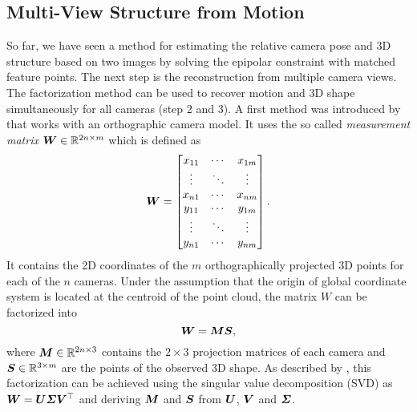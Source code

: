 			
		\subsection{Multi-View Structure from Motion}
			So far, we have seen a method for estimating the relative camera pose and 3D structure based on two images by solving the epipolar constraint with matched feature points.
			The next step is the reconstruction from multiple camera views.
			The factorization method can be used to recover motion and 3D shape simultaneously for all cameras (step 2 and 3).
			A first method was introduced by \cite{tomasi1992factorization} that works with an orthographic camera model.
			It uses the so called \emph{measurement matrix} $\bm{W} \in \mathbb{R}^{2n \times m}$ which is defined as
			\begin{equation}\label{eq:measurement_matrix}
				\bm{W} =
				\begin{bmatrix}
					x_{11} & \cdots & x_{1m} \\ 
					\vdots & \ddots & \vdots \\ 
					x_{n1} & \cdots & x_{nm} \\ 
					y_{11} & \cdots & y_{1m} \\ 
					\vdots & \ddots & \vdots \\ 
					y_{n1} & \cdots & y_{nm}
				\end{bmatrix}. 
			\end{equation}
			It contains the 2D coordinates of the $m$ orthographically projected 3D points for each of the $n$ cameras.
			Under the assumption that the origin of global coordinate system is located at the centroid of the point cloud, the matrix $W$ can be factorized into
			\begin{equation}\label{eq:factorization_method}
				\bm{W} = \bm{M} \bm{S},
			\end{equation}
			where $\bm{M} \in \mathbb{R}^{2n \times 3}$ contains the $2 \times 3$ projection matrices of each camera and $\bm{S} \in \mathbb{R}^{3 \times m}$  are the points of the observed 3D shape.
			As described by \cite{tomasi1992factorization}, this factorization can be achieved using the singular value decomposition (SVD) as $\bm{W} = \bm{U} \bm{\varSigma} \bm{V}^\top$ and deriving $\bm{M}$ and $\bm{S}$ from $\bm{U}$, $\bm{V}$ and $\bm{\varSigma}$.
			
